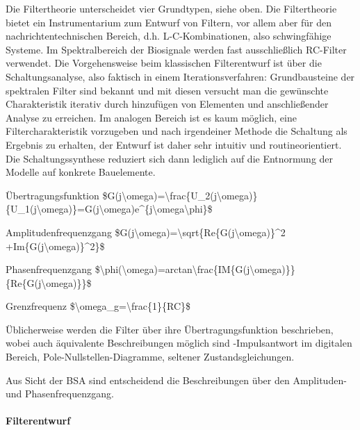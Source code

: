 \documentclass[a4paper]{article}
\begin{document}
\begin{multicols}{3}
\begin{itemize*}
    \item Die Filtertheorie unterscheidet vier Grundtypen, siehe oben. Die Filtertheorie bietet ein Instrumentarium zum Entwurf von Filtern, vor allem aber für den nachrichtentechnischen Bereich, d.h. L-C-Kombinationen, also schwingfähige Systeme. Im Spektralbereich der Biosignale werden fast ausschließlich RC-Filter verwendet. Die Vorgehensweise beim klassischen Filterentwurf ist über die Schaltungsanalyse, also faktisch in einem Iterationsverfahren: Grundbausteine der spektralen Filter sind bekannt und mit diesen versucht man die gewünschte Charakteristik iterativ durch hinzufügen von Elementen und anschließender Analyse zu erreichen. Im analogen Bereich ist es kaum möglich, eine Filtercharakteristik vorzugeben und nach irgendeiner Methode die Schaltung als Ergebnis zu erhalten, der Entwurf ist daher sehr intuitiv und routineorientiert. Die Schaltungssynthese reduziert sich dann lediglich auf die Entnormung der Modelle auf konkrete Bauelemente.
    \begin{itemize*}
      \item Übertragungsfunktion \$G(j\textbackslash omega)=\textbackslash frac\{U\_2(j\textbackslash omega)\}\{U\_1(j\textbackslash omega)\}=\textbar G(j\textbackslash omega)\textbar*e\^{}\{j\textbackslash omega\textbackslash phi\}\$
      \item Amplitudenfrequenzgang \$\textbar G(j\textbackslash omega)\textbar=\textbackslash sqrt\{Re\{G(j\textbackslash omega)\}\^{}2 +Im\{G(j\textbackslash omega)\}\^{}2\}\$
      \item Phasenfrequenzgang \$\textbackslash phi(\textbackslash omega)=arctan\textbackslash frac\{IM\{G(j\textbackslash omega)\}\}\{Re\{G(j\textbackslash omega)\}\}\$
      \item Grenzfrequenz \$\textbackslash omega\_g=\textbackslash frac\{1\}\{RC\}\$
    \end{itemize*}
    \item Üblicherweise werden die Filter über ihre Übertragungsfunktion beschrieben, wobei auch äquivalente Beschreibungen möglich sind -Impulsantwort im digitalen Bereich, Pole-Nullstellen-Diagramme, seltener Zustandsgleichungen.
    \item Aus Sicht der BSA sind entscheidend die Beschreibungen über den Amplituden- und Phasenfrequenzgang.
  \end{itemize*}

  \paragraph{Filterentwurf}\label{filterentwurf}


\end{multicols}
\end{document}
